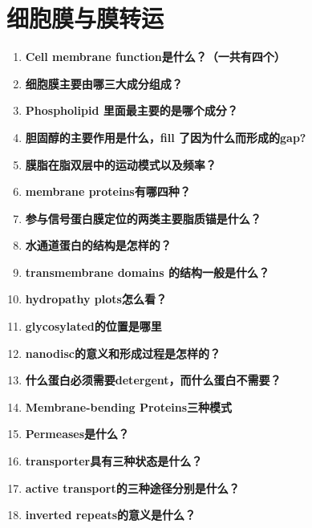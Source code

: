 \documentclass[12pt,fontset=none]{ctexart}
\begin{document}
\section*{细胞膜与膜转运}
\begin{enumerate}
\item \textbf{Cell membrane function是什么？（一共有四个）}

\item \textbf{细胞膜主要由哪三大成分组成？}

\item \textbf{Phospholipid 里面最主要的是哪个成分？}

\item \textbf{胆固醇的主要作用是什么，fill 了因为什么而形成的gap?}

\item \textbf{膜脂在脂双层中的运动模式以及频率？}

\item \textbf{membrane proteins有哪四种？}

\item \textbf{参与信号蛋白膜定位的两类主要脂质锚是什么？}

\item \textbf{水通道蛋白的结构是怎样的？}

\item \textbf{transmembrane domains 的结构一般是什么？}

\item \textbf{hydropathy plots怎么看？}

\item \textbf{glycosylated的位置是哪里}

\item \textbf{nanodisc的意义和形成过程是怎样的？}

\item \textbf{什么蛋白必须需要detergent，而什么蛋白不需要？}

\item \textbf{Membrane-bending Proteins三种模式}

\item \textbf{Permeases是什么？}

\item \textbf{transporter具有三种状态是什么？}

\item \textbf{active transport的三种途径分别是什么？}

\item \textbf{inverted repeats的意义是什么？}


\end{enumerate}
\end{document}
